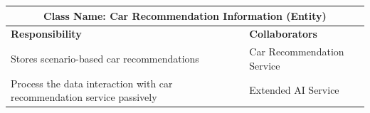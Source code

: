 \documentclass[]{article}
\begin{document}
\begin{table}[H]
  \centering
  \renewcommand{\arraystretch}{1.3} %
  \begin{tabular}{|p{7.5cm}|p{7.5cm}|}
    \hline
    \multicolumn{2}{|c|}{\textbf{Class Name: Car Recommendation Information (Entity)}}                  \\
    \hline
    \textbf{Responsibility}                                                & \textbf{Collaborators}     \\
    \hline
    Stores scenario-based car recommendations                              & Car Recommendation Service \\
    Process the data interaction with car recommendation service passively & Extended AI Service        \\
    \hline
  \end{tabular}
\end{table}
\end{document}
